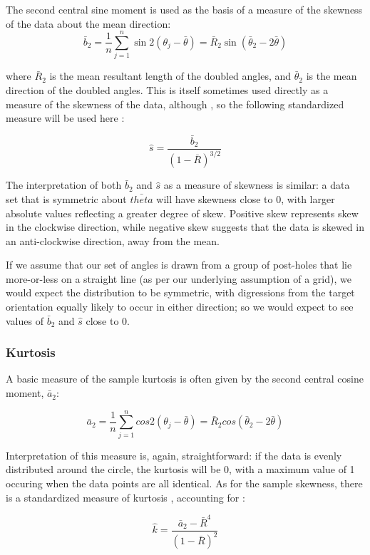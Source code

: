 \documentclass[../../ArchStats.tex]{subfiles}
\begin{document}
The second central sine moment is used as the basis of a measure of the skewness of the data about the mean direction:
\[ \bar{b}_2 = \frac{1}{n} \sum_{j=1}^n \sin 2(\theta_j-\bar{\theta}) = \bar{R}_2 \sin(\bar{\theta}_2 - 2\bar{\theta}) \]

where $\bar{R}_2$ is the mean resultant length of the doubled angles, and $\bar{\theta}_2$ is the mean direction of the doubled angles. This is itself sometimes used directly as a measure of the skewness of the data, although , so the following standardized measure will be used here \cite{Mardia1999}:

\[\hat{s} = \frac{\bar{b}_2}{(1-\bar{R})^{3/2}}\]

The interpretation of both $\bar{b}_2$ and $\hat{s}$ as a measure of skewness is similar: a data set that is symmetric about $\bar{theta}$ will have skewness close to 0, with larger absolute values reflecting a greater degree of skew. Positive skew represents skew in the clockwise direction, while negative skew suggests that the data is skewed in an anti-clockwise direction, away from the mean.

If we assume that our set of angles is drawn from a group of post-holes that lie more-or-less on a straight line (as per our underlying assumption of a grid), we would expect the distribution to be symmetric, with digressions from the target orientation equally likely to occur in either direction; so we would expect to see values of $\bar{b}_2$ and $\hat{s}$ close to 0.

\subsubsection{Kurtosis}
A basic measure of the sample kurtosis is often given by the second central cosine moment, $\bar{a}_2$:

\[ \bar{a}_2 = \frac{1}{n} \sum_{j=1}^n cos 2(\theta_j-\bar{\theta}) = \bar{R}_2 cos(\bar{\theta}_2 - 2\bar{\theta}) \]

Interpretation of this measure is, again, straightforward: if the data is evenly distributed around the circle, the kurtosis will be 0, with a maximum value of 1 occuring when the data points are all identical. As for the sample skewness, there is a standardized measure of kurtosis \cite{Mardia1999}, accounting for :

\[ \hat{k} = \frac{\bar{a}_2 - \bar{R}^4}{(1-\bar{R})^2}\]
\end{document}
